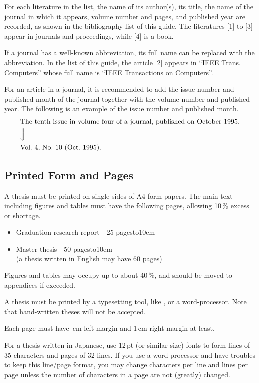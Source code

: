 For each literature in the list, the name of its author(s), its title, the
name of the journal in which it appears, volume number and pages, and
published year are recorded, as shown in the bibliography list of this guide.
The literatures [1] to [3] appear in journals and proceedings, while [4] is
a book.

If a journal has a well-known abbreviation, its full name can be replaced
with the abbreviation.  In the list of this guide, the article [2]
appears in ``IEEE Trans. Computers'' whose full name is ``IEEE Transactions
on Computers''.

For an article in a journal, it is recommended to add the issue number and
published month of the journal together with the volume number and published
year.  The following is an example of the issue number and published month.
\begin{eqnarray*}
&\hbox{The tenth issue in volume four of a journal, published on October 1995.}
\\
&\Big\Downarrow\\
&\hbox{Vol.~4, No.~10 (Oct.~1995)}.
\end{eqnarray*}

\subsection{Printed Form and Pages}\label{subsec-format}
A thesis must be printed on single sides of A4 form papers.  {\EM The main
text including figures and tables} must have the following pages, allowing
10\,\% excess or shortage.
\begin{itemize}%
\item
Graduation research report\ \dotfill\ 25 pages\hbox to10em{}
\item
Master thesis\ \dotfill\ 50 pages\hbox to10em{}\\
\hbox{}\hfill(a thesis written in English may have 60 pages)
\end{itemize}%
Figures and tables may occupy up to about 40\,\%, and should be moved to
appendices if exceeded.

A thesis must be printed by a typesetting tool, like \LATEX, or a
word-processor.  Note that {\EM hand-written theses will not be accepted}.

Each page must have {\,cm left margin and 1\,cm right margin} at least.

For a thesis written in Japanese, use 12\,pt (or similar size) fonts to form
{\EM lines of 35 characters and pages of 32 lines}.  If you use a
word-processor and have troubles to keep this line/page format, you may
change characters per line and lines per page unless the number of
characters in a page are not (greatly) changed.

